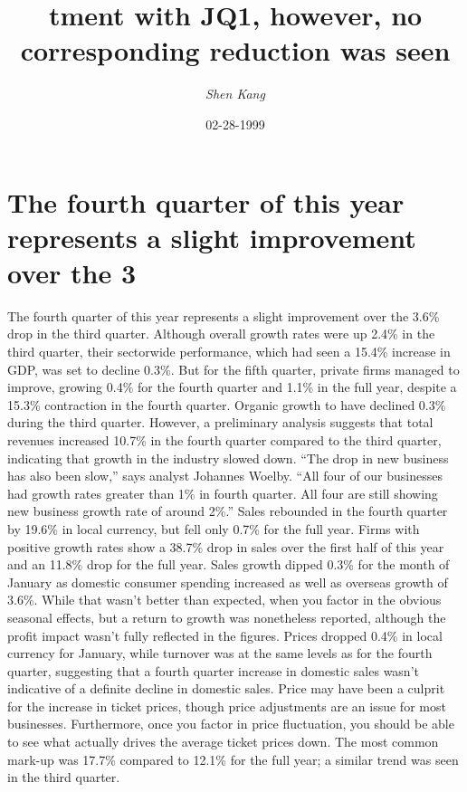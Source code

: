 \documentclass{article}%
\title{tment with JQ1, however, no corresponding reduction was seen}%
\author{\textit{Shen Kang}}%
\date{02-28-1999}%
\begin{document}
%
\normalsize%
\maketitle%
\section{The fourth quarter of this year represents a slight improvement over the 3}%
\label{sec:Thefourthquarterofthisyearrepresentsaslightimprovementoverthe3}%
The fourth quarter of this year represents a slight improvement over the 3.6\% drop in the third quarter. Although overall growth rates were up 2.4\% in the third quarter, their sectorwide performance, which had seen a 15.4\% increase in GDP, was set to decline 0.3\%. But for the fifth quarter, private firms managed to improve, growing 0.4\% for the fourth quarter and 1.1\% in the full year, despite a 15.3\% contraction in the fourth quarter.\newline%
Organic growth to have declined 0.3\% during the third quarter. However, a preliminary analysis suggests that total revenues increased 10.7\% in the fourth quarter compared to the third quarter, indicating that growth in the industry slowed down. “The drop in new business has also been slow,” says analyst Johannes Woelby. “All four of our businesses had growth rates greater than 1\% in fourth quarter. All four are still showing new business growth rate of around 2\%.”\newline%
Sales rebounded in the fourth quarter by 19.6\% in local currency, but fell only 0.7\% for the full year. Firms with positive growth rates show a 38.7\% drop in sales over the first half of this year and an 11.8\% drop for the full year.\newline%
Sales growth dipped 0.3\% for the month of January as domestic consumer spending increased as well as overseas growth of 3.6\%. While that wasn’t better than expected, when you factor in the obvious seasonal effects, but a return to growth was nonetheless reported, although the profit impact wasn’t fully reflected in the figures.\newline%
Prices dropped 0.4\% in local currency for January, while turnover was at the same levels as for the fourth quarter, suggesting that a fourth quarter increase in domestic sales wasn’t indicative of a definite decline in domestic sales.\newline%
Price may have been a culprit for the increase in ticket prices, though price adjustments are an issue for most businesses. Furthermore, once you factor in price fluctuation, you should be able to see what actually drives the average ticket prices down. The most common mark{-}up was 17.7\% compared to 12.1\% for the full year; a similar trend was seen in the third quarter.\newline%
\end{document}
